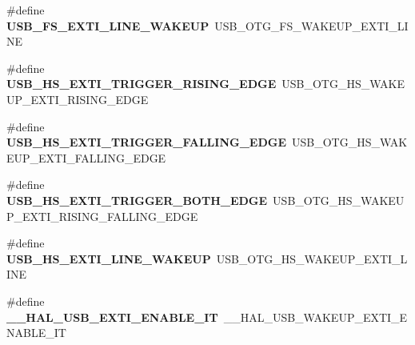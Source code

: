 \begin{DoxyCompactItemize}
\item 
\#define {\bfseries U\+S\+B\+\_\+\+F\+S\+\_\+\+E\+X\+T\+I\+\_\+\+L\+I\+N\+E\+\_\+\+W\+A\+K\+E\+UP}~U\+S\+B\+\_\+\+O\+T\+G\+\_\+\+F\+S\+\_\+\+W\+A\+K\+E\+U\+P\+\_\+\+E\+X\+T\+I\+\_\+\+L\+I\+NE\hypertarget{group___h_a_l___u_s_b___aliased___macros_ga9990232132734bde77e11c4f8d2e4163}{}\label{group___h_a_l___u_s_b___aliased___macros_ga9990232132734bde77e11c4f8d2e4163}

\item 
\#define {\bfseries U\+S\+B\+\_\+\+H\+S\+\_\+\+E\+X\+T\+I\+\_\+\+T\+R\+I\+G\+G\+E\+R\+\_\+\+R\+I\+S\+I\+N\+G\+\_\+\+E\+D\+GE}~U\+S\+B\+\_\+\+O\+T\+G\+\_\+\+H\+S\+\_\+\+W\+A\+K\+E\+U\+P\+\_\+\+E\+X\+T\+I\+\_\+\+R\+I\+S\+I\+N\+G\+\_\+\+E\+D\+GE\hypertarget{group___h_a_l___u_s_b___aliased___macros_gabae8c431934cc5189524c41c4a413e5d}{}\label{group___h_a_l___u_s_b___aliased___macros_gabae8c431934cc5189524c41c4a413e5d}

\item 
\#define {\bfseries U\+S\+B\+\_\+\+H\+S\+\_\+\+E\+X\+T\+I\+\_\+\+T\+R\+I\+G\+G\+E\+R\+\_\+\+F\+A\+L\+L\+I\+N\+G\+\_\+\+E\+D\+GE}~U\+S\+B\+\_\+\+O\+T\+G\+\_\+\+H\+S\+\_\+\+W\+A\+K\+E\+U\+P\+\_\+\+E\+X\+T\+I\+\_\+\+F\+A\+L\+L\+I\+N\+G\+\_\+\+E\+D\+GE\hypertarget{group___h_a_l___u_s_b___aliased___macros_gacf7c7cd4c0acdaef836d1381884eafdc}{}\label{group___h_a_l___u_s_b___aliased___macros_gacf7c7cd4c0acdaef836d1381884eafdc}

\item 
\#define {\bfseries U\+S\+B\+\_\+\+H\+S\+\_\+\+E\+X\+T\+I\+\_\+\+T\+R\+I\+G\+G\+E\+R\+\_\+\+B\+O\+T\+H\+\_\+\+E\+D\+GE}~U\+S\+B\+\_\+\+O\+T\+G\+\_\+\+H\+S\+\_\+\+W\+A\+K\+E\+U\+P\+\_\+\+E\+X\+T\+I\+\_\+\+R\+I\+S\+I\+N\+G\+\_\+\+F\+A\+L\+L\+I\+N\+G\+\_\+\+E\+D\+GE\hypertarget{group___h_a_l___u_s_b___aliased___macros_ga88242c33988234109ab398a9195f6c11}{}\label{group___h_a_l___u_s_b___aliased___macros_ga88242c33988234109ab398a9195f6c11}

\item 
\#define {\bfseries U\+S\+B\+\_\+\+H\+S\+\_\+\+E\+X\+T\+I\+\_\+\+L\+I\+N\+E\+\_\+\+W\+A\+K\+E\+UP}~U\+S\+B\+\_\+\+O\+T\+G\+\_\+\+H\+S\+\_\+\+W\+A\+K\+E\+U\+P\+\_\+\+E\+X\+T\+I\+\_\+\+L\+I\+NE\hypertarget{group___h_a_l___u_s_b___aliased___macros_ga76b8cf072166993b9e3094bb8c983265}{}\label{group___h_a_l___u_s_b___aliased___macros_ga76b8cf072166993b9e3094bb8c983265}

\item 
\#define {\bfseries \+\_\+\+\_\+\+H\+A\+L\+\_\+\+U\+S\+B\+\_\+\+E\+X\+T\+I\+\_\+\+E\+N\+A\+B\+L\+E\+\_\+\+IT}~\+\_\+\+\_\+\+H\+A\+L\+\_\+\+U\+S\+B\+\_\+\+W\+A\+K\+E\+U\+P\+\_\+\+E\+X\+T\+I\+\_\+\+E\+N\+A\+B\+L\+E\+\_\+\+IT\hypertarget{group___h_a_l___u_s_b___aliased___macros_ga8c010632fff5661d2424e4a656216044}{}\label{group___h_a_l___u_s_b___aliased___macros_ga8c010632fff5661d2424e4a656216044}


\end{DoxyCompactItemize}

